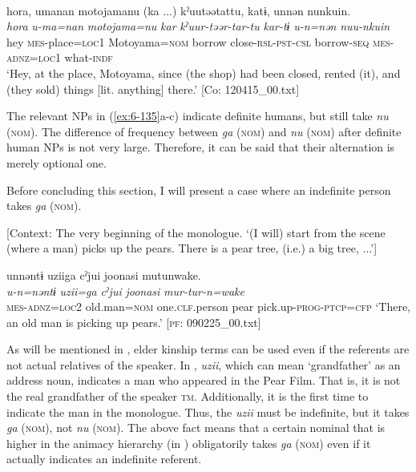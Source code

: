 \begin{styleBeschriftung}
\ex{}\\
{\TM}
\glll  {\textbar}hora{\textbar},  umanan  motojamanu  (ka ...)  kˀuutəətattu,      katɨ,  unnən  nunkuin.\\
\textit{hora}  \textit{u-ma=nan}  \textit{motojama=nu}  \textit{kar}  \textit{kˀuur-təər-tar-tu}   \textit{kar-tɨ}  \textit{u-n=nən}  \textit{nuu-nkuin}\\
hey  \textsc{mes}-place=\textsc{loc1}  Motoyama=\textsc{nom}  borrow  close-\textsc{rsl}-\textsc{pst}-\textsc{csl}   borrow-\textsc{seq}  \textsc{mes}-\textsc{adnz}=\textsc{loc1}  what-\textsc{indf}\\
\glt ‘Hey, at the place, Motoyama, since (the shop) had been closed, rented (it), and (they sold) things [lit. anything] there.’ [Co: 120415\_00.txt]
\z

The relevant NPs in (\ref{ex:6-135}a-c) indicate definite humans, but still take \textit{nu} (\textsc{nom}). The difference of frequency between \textit{ga} (\textsc{nom}) and \textit{nu} (\textsc{nom}) after definite human NPs is not very large. Therefore, it can be said that their alternation is merely optional one.

  Before concluding this section, I will present a case where an indefinite person takes \textit{ga} (\textsc{nom}).

\ea\label{ex:6-136}
  [Context: The very beginning of the monologue. {\TM} ‘(I will) start from the scene (where a man) picks up the pears. There is a pear tree, (i.e.) a big tree, ...’]

{\TM}
\glll unnəntɨ  uziiga  cˀjui  joonasi    mutunwake.\\
\textit{u-n=nəntɨ}  \textit{uzii=ga}  \textit{cˀjui}  \textit{joonasi} \textit{mur-tur-n=wake}\\
    \textsc{mes}-\textsc{adnz}=\textsc{loc2}  old.man=\textsc{nom}  one.\textsc{clf}.person  pear   pick.up-\textsc{prog}-\textsc{ptcp}=\textsc{cfp}
\glt    ‘There, an old man is picking up pears.’ [\textsc{pf}: 090225\_00.txt]
\z

As will be mentioned in , elder kinship terms can be used even if the referents are not actual relatives of the speaker. In , \textit{uzii}, which can mean ‘grandfather’ as an address noun, indicates a man who appeared in the Pear Film. That is, it is not the real grandfather of the speaker \textsc{tm}. Additionally, it is the first time to indicate the man in the monologue. Thus, the \textit{uzii} must be indefinite, but it takes \textit{ga} (\textsc{nom}), not \textit{nu} (\textsc{nom}). The above fact means that a certain nominal that is higher in the animacy hierarchy (in ) obligatorily takes \textit{ga} (\textsc{nom}) even if it actually indicates an indefinite referent.


\end{styleBeschriftung}
